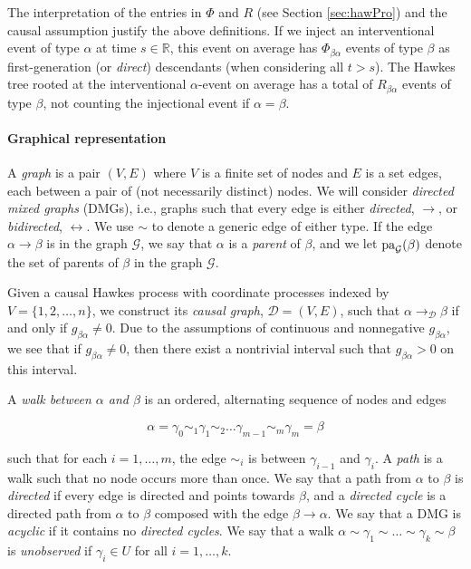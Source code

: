\documentclass[accepted]{uai2021} %
\newcommand{\pa}{\textnormal{pa}}
\begin{document}
The interpretation of the entries in $\Phi$ and $R$ (see Section 
\ref{sec:hawPro}) and the causal assumption justify the above definitions. If 
we inject an 
interventional event of type $\alpha$ at time $s \in \mathbb{R}$, this 
event on average has $\Phi_{\beta\alpha}$ events 
of type $\beta$ as first-generation (or \emph{direct}) descendants (when 
considering all $t > s$). The Hawkes tree rooted at the 
interventional $\alpha$-event on average has a total of $R_{\beta\alpha}$ 
events of 
type $\beta$, not counting the injectional event if $\alpha=\beta$. 


\paragraph{Graphical representation}

A {\it graph} is a pair $(V,E)$ where $V$ is a finite set of nodes and $E$ is a 
set edges, each between a pair of (not necessarily distinct) nodes. We will  
consider {\it directed mixed graphs} (DMGs), i.e., graphs such that every edge 
is 
either \emph{directed}, $\rightarrow$, or \emph{bidirected}, $\leftrightarrow$. 
We use $\sim$ to denote a generic edge of either type. If the edge 
$\alpha\rightarrow\beta$ is in the graph $\mathcal{G}$, we say that $\alpha$ is 
a \emph{parent} of $\beta$, and we let $\pa_\mathcal{G}(\beta)$ denote the set 
of parents 
of $\beta$ in the graph $\mathcal{G}$.

Given a causal Hawkes process with coordinate processes indexed by $V = 
\{1,2,\ldots,n\}$, we construct its \emph{causal graph}, $\mathcal{D} = (V,E)$, 
such that 
$\alpha \rightarrow_\mathcal{D} \beta$ if and only if $g_{\beta\alpha} \neq 0$. 
Due 
to the assumptions of continuous and nonnegative $g_{\beta\alpha}$, we see 
that if $g_{\beta\alpha}\neq 0$, then there exist a nontrivial interval such 
that $g_{\beta\alpha} > 0$ on this interval.

A {\it walk between $\alpha$ and $\beta$} is an ordered, alternating sequence 
of nodes and edges

$$
\alpha = \gamma_0 \sim_1 \gamma_1 \sim_2 \ldots \gamma_{m-1} \sim_m \gamma_{m} 
= \beta
$$

such that for each $i = 1,\ldots,m$, the edge $\sim_i$ is between 
$\gamma_{i-1}$ and $\gamma_i$. A {\it path} is a walk such that no node occurs 
more than once. We say that a path from $\alpha$ to $\beta$ is \emph{directed} 
if every edge is directed and points towards $\beta$, and a \emph{directed 
cycle} is a directed path from $\alpha$ to $\beta$ composed with the edge 
$\beta\rightarrow\alpha$. We say that a DMG is \emph{acyclic} if it contains no 
\emph{directed cycles}. We say that a walk $\alpha \sim \gamma_1 \sim \ldots 
\sim 
\gamma_k \sim \beta$ is \emph{unobserved} if $\gamma_i \in U$ for all $i = 
1,\ldots, k$. 
\end{document}
